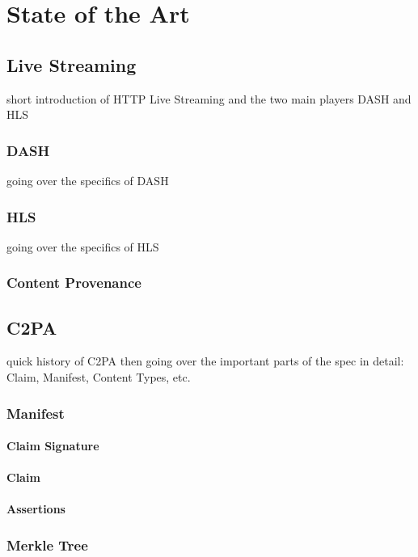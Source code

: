 \chapter{State of the Art\label{cha:chapter2}}



\section{Live Streaming\label{sec:live}}

short introduction of HTTP Live Streaming and the two main players DASH and HLS

\subsection{DASH\label{sub:dash}}

going over the specifics of DASH

\subsection{HLS\label{sub:hls}}

going over the specifics of HLS

\subsection{Content Provenance\label{sec:conpro}}


\section{C2PA\label{c2pa}}

quick history of C2PA then going over the important parts of the spec in detail: Claim, Manifest, Content Types, etc.

\subsection{Manifest}

\subsubsection{Claim Signature}

\subsubsection{Claim}

\subsubsection{Assertions}

\subsection{Merkle Tree}

